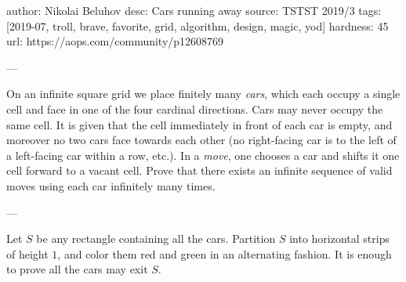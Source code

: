 author: Nikolai Beluhov
desc: Cars running away
source: TSTST 2019/3
tags: [2019-07, troll, brave, favorite, grid, algorithm, design, magic, yod]
hardness: 45
url: https://aops.com/community/p12608769

---

On an infinite square grid we place finitely many \emph{cars},
which each occupy a single cell and face in one of the four cardinal directions.
Cars may never occupy the same cell.
It is given that the cell immediately in front of each car is empty,
and moreover no two cars face towards each other
(no right-facing car is to the left of a left-facing car within a row, etc.).
In a \emph{move}, one chooses a car and shifts it one cell forward to a vacant cell.
Prove that there exists an infinite sequence of valid moves
using each car infinitely many times.

---

Let $S$ be any rectangle containing all the cars.
Partition $S$ into horizontal strips of height $1$,
and color them red and green in an alternating fashion.
It is enough to prove all the cars may exit $S$.

